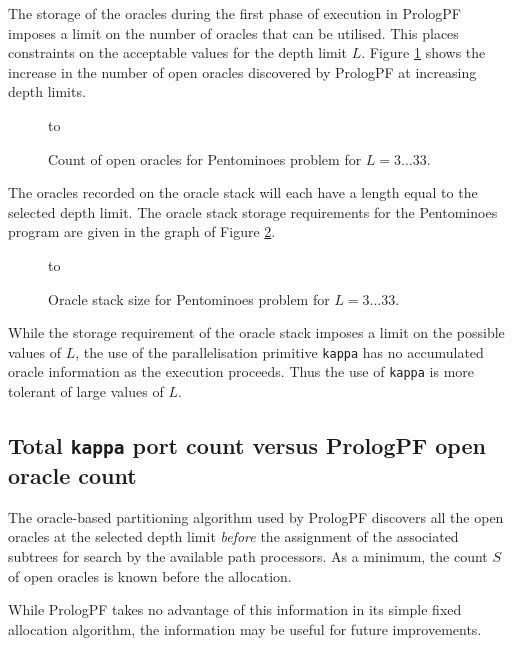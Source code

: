 The storage of the oracles during the first phase of execution in PrologPF imposes
a limit on the number of oracles that can be utilised.  This places constraints on
the acceptable values for the depth limit $L$.  Figure \ref{pent_orc_count} shows the
increase in the number of open oracles discovered by PrologPF at increasing depth
limits.

\begin{figure}[htbp]
\vspace{5mm} \hbox to 
\caption{Count of open oracles for Pentominoes problem for $L=3\ldots 33$.}
\vspace{5mm}
\label{pent_orc_count}
\end{figure}

The oracles recorded on the oracle stack will each have a length equal to the selected
depth limit.  The oracle stack storage requirements for the Pentominoes program are
given in the graph of Figure \ref{pent_orc_storage}.

\begin{figure}[htbp]
\vspace{5mm} \hbox to 
\caption{Oracle stack size for Pentominoes problem for $L=3\ldots 33$.}
\vspace{5mm}
\label{pent_orc_storage}
\end{figure}

While the storage requirement of the oracle stack imposes a limit on the possible values
of $L$, the use of the parallelisation primitive \texttt{kappa} has no accumulated oracle
information as the execution proceeds.  Thus the use of \texttt{kappa} is more tolerant of
large values of $L$. 

\subsection{Total \texttt{kappa} port count versus PrologPF open oracle count}

The oracle-based partitioning algorithm used by PrologPF discovers all the open
oracles at the selected depth limit \textit{before} the assignment of the associated
subtrees for search by the available path processors.  As a minimum, the count
$S$ of open oracles is known before the allocation.

While PrologPF takes no advantage of this information in its simple fixed allocation
algorithm, the information may be useful for future improvements.

